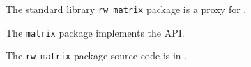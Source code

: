 
The standard library {\tt rw\_matrix} package is a proxy for .

The {\tt matrix} package implements the  API.

The {\tt rw\_matrix} package source code is in .




